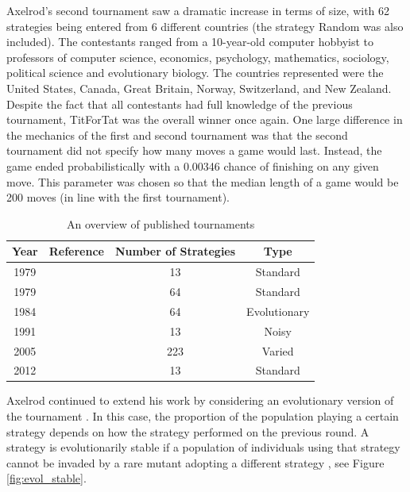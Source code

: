 Axelrod's second tournament \cite{Axelrod1980b} saw a dramatic increase in terms of size, with 62 strategies being entered from 6 different countries (the strategy Random was also included).
The contestants ranged from a 10-year-old computer hobbyist to professors of computer science, economics, psychology, mathematics, sociology, political science and evolutionary biology.
The countries represented were the United States, Canada, Great Britain, Norway, Switzerland, and New Zealand.
Despite the fact that all contestants had full knowledge of the previous tournament, TitForTat was the overall winner once again.
One large difference in the mechanics of the first and second tournament was that the second tournament did not specify how many moves a game would last.
Instead, the game ended probabilistically with a 0.00346 chance of finishing on any given move.
This parameter was chosen so that the median length of a game would be 200 moves (in line with the first tournament).

\begin{table}[htbp]
    \centering
    \begin{tabular}{c c c c}
        \toprule
        Year & Reference & Number of Strategies & Type\\
        \midrule
        1979 & \cite{Axelrod1980a} & 13 & Standard\\
        1979 & \cite{Axelrod1980b} & 64 & Standard\\
        1984 & \cite{Axelrod1981} & 64 & Evolutionary\\
        1991 & \cite{Bendor1991} & 13 & Noisy\\
        2005 & \cite{Chong2004} & 223 & Varied\\
        2012 & \cite{Stewart2012} & 13 & Standard\\
        \bottomrule
    \end{tabular}
    \caption{An overview of published tournaments}
    \label{tab:tournament_refs}
\end{table}

Axelrod continued to extend his work by considering an evolutionary version of the tournament \cite{Axelrod1981, Axelrod1984}.
In this case, the proportion of the population playing a certain strategy depends on how the strategy performed on the previous round.
A strategy is evolutionarily stable if a population of individuals using that strategy cannot be invaded by a rare mutant adopting a different strategy \cite{Axelrod1981}, see Figure \ref{fig:evol_stable}.

